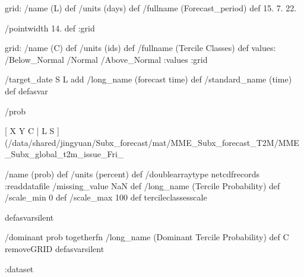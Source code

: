 \begin{ingrid}
grid:
/name (L) def
/units (days) def
/fullname (Forecast_period) def
15. 7. 22. 

/pointwidth 14. def
:grid

grid:
/name (C) def
/units (ids) def
/fullname (Tercile Classes) def
values: /Below_Normal /Normal /Above_Normal :values
:grid

/target_date { S L add /long_name (forecast time) def /standard_name (time) def } defasvar

/prob {
[ X Y C | L S ] (/data/shared/jingyuan/Subx_forecast/mat/MME_Subx_forecast_T2M/MME_Subx_global_t2m_issue_Fri_%

/name (prob) def
/units (percent) def
/doublearraytype netcdfrecords :readdatafile
/missing_value NaN def
/long_name (Tercile Probability) def
/scale_min 0 def
/scale_max 100 def
tercileclassesscale
} defasvarsilent

/dominant {
prob togetherfn
/long_name (Dominant Tercile Probability) def
C removeGRID
} defasvarsilent

:dataset
\end{ingrid}
